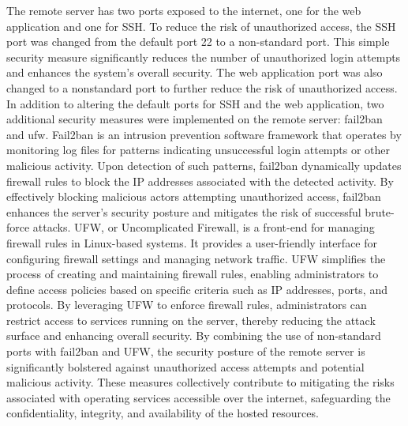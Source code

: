 \documentclass[12pt]{article}
\begin{document}
\newline
\newline
\noindent The remote server has two ports exposed to the internet, one for the web application and one for SSH. To reduce the risk of unauthorized access, the SSH port was changed from the default port 22 to a non-standard port. This simple security measure significantly reduces the number of unauthorized login attempts and enhances the system's overall security. The web application port was also changed to a nonstandard port to further reduce the risk of unauthorized access. In addition to altering the default ports for SSH and the web application, two additional security measures were implemented on the remote server: fail2ban and ufw.
\newline
\newline
\noindent Fail2ban is an intrusion prevention software framework that operates by monitoring log files for patterns indicating unsuccessful login attempts or other malicious activity. Upon detection of such patterns, fail2ban dynamically updates firewall rules to block the IP addresses associated with the detected activity. By effectively blocking malicious actors attempting unauthorized access, fail2ban enhances the server's security posture and mitigates the risk of successful brute-force attacks.
\newline
\newline
\noindent UFW, or Uncomplicated Firewall, is a front-end for managing firewall rules in Linux-based systems. It provides a user-friendly interface for configuring firewall settings and managing network traffic. UFW simplifies the process of creating and maintaining firewall rules, enabling administrators to define access policies based on specific criteria such as IP addresses, ports, and protocols. By leveraging UFW to enforce firewall rules, administrators can restrict access to services running on the server, thereby reducing the attack surface and enhancing overall security.
\newline
\newline
\noindent By combining the use of non-standard ports with fail2ban and UFW, the security posture of the remote server is significantly bolstered against unauthorized access attempts and potential malicious activity. These measures collectively contribute to mitigating the risks associated with operating services accessible over the internet, safeguarding the confidentiality, integrity, and availability of the hosted resources.
\newline
\newline
\end{document}
